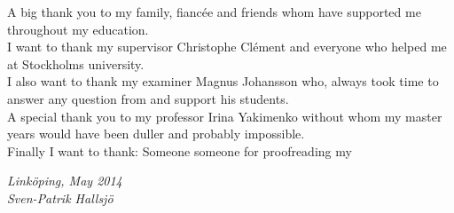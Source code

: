 \begin{acknowledgments} A big thank you to my family, fiancée and friends whom have supported me throughout my education.\\
I want to thank my supervisor Christophe Clément and everyone who helped me at Stockholms university. \\
I also want to thank my examiner Magnus Johansson who, always took time to answer any question from and support his students. \\ 
A special thank you to my professor Irina Yakimenko without whom my master years would have been duller and probably impossible.\\
Finally I want to thank: Someone someone for proofreading my

  \addvspace{1em}
  \begin{flushright}
    \textit{%
      Linköping, May 2014\\
      Sven-Patrik Hallsjö%
    }
  \end{flushright}
\end{acknowledgments}
